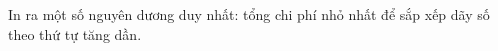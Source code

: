 In ra một số nguyên dương duy nhất: tổng chi phí nhỏ nhất để sắp xếp dãy số theo thứ tự tăng dần.

\